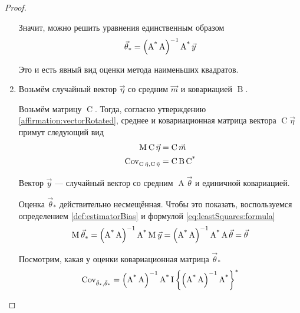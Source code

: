 \begin{proof}
\begin{enumerate}
      Значит, можно решить уравнения единственным образом
      \begin{equation}\label{eq:leastSquares:formula}
          \index{оценка!метода наименьших квадратов!формула}
          \vec{\theta}_*
          = \left( \operatorname{A^*} \operatorname{A} \right)^{-1}
        \operatorname{A^*} \vec{y}
      \end{equation}

      Это и есть явный вид оценки метода наименьших квадратов.

      \item Возьмём случайный вектор $\vec{\eta}$ со средним $\vec{m}$
      и ковариацией $\operatorname{B}$.
      
      Возьмём матрицу $\operatorname{C}$. Тогда, согласно утверждению
      \ref{affirmation:vectorRotated}, среднее и ковариационная матрица
      вектора $\operatorname{C}\vec{\eta}$ примут следующий вид
      \begin{align*}
          \operatorname{M}_{} \operatorname{C}\vec{\eta}
        &= \operatorname{C} \vec{m}\\
          \operatorname{Cov^{}_{\operatorname{C} \vec{\eta}, \operatorname{C} \vec{\eta}}}
        &= \operatorname{C} \operatorname{B} \operatorname{C^*}
      \end{align*}

      Вектор $\vec{y}$ --- случайный вектор со средним
      $\operatorname{A} \vec{\theta}$ и единичной ковариацией.

      Оценка $\vec{\theta}_*$ действительно несмещённая. Чтобы это
      показать, воспользуемся определением \ref{def:estimatorBias}
      и формулой \ref{eq:leastSquares:formula}
      \begin{align*}
          \operatorname{M}_{} \vec{\theta}_*
          = \left( \operatorname{A^*} \operatorname{A} \right)^{-1}
        \operatorname{A^*} \operatorname{M}_{} \vec{y}
          = \left( \operatorname{A^*} \operatorname{A} \right)^{-1}
        \operatorname{A^*} \operatorname{A} \vec{\theta}
          = \vec{\theta}
      \end{align*}

      Посмотрим, какая у оценки ковариационная матрица $\vec{\theta}_*$
      \begin{align*}
          \operatorname{Cov^{}_{\vec{\theta}_*, \vec{\theta}_*}}
          = \left( \operatorname{A^*} \operatorname{A} \right)^{-1}
        \operatorname{A^*} \operatorname{I} \left\{
            \left( \operatorname{A^*} \operatorname{A} \right)^{-1}
        \operatorname{A^*} \right\}^*
      \end{align*}


\end{enumerate}
\end{proof}
